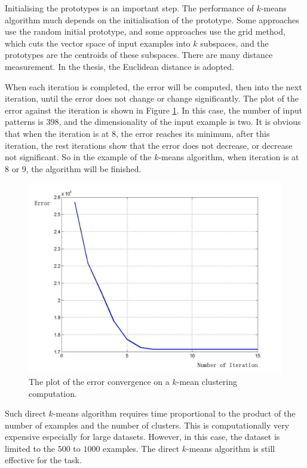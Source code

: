 Initialising the prototypes is an important step. The performance of $k$-means algorithm much depends on the initialisation of the prototype. Some approaches use the random initial prototype, and some approaches use the grid method, which cuts the vector space of input examples into $k$ subspaces, and the prototypes are the centroids of these subspaces. There are many distance measurement. In the thesis, the Euclidean distance is adopted. 

When each iteration is completed, the error will be computed, then into the next iteration, until the error does not change or change significantly. The plot of the error against the iteration is shown in \mbox{Figure} \ref{fig:kmeanserror}. In this case, the number of input patterns is $398$, and the dimensionality of the input example is two. It is obvious that when the iteration is at 8, the error reaches its minimum, after this iteration, the rest iterations show that the error does not decrease, or decrease not significant. So in the example of the $k$-means algorithm, when iteration is at 8 or 9, the algorithm will be finished.
\begin{figure}[ht]
 \includegraphics[width=\columnwidth]{ch3/figures/kmeanserror.jpg}
\caption{The plot of the error convergence on a $k$-mean clustering computation.}
\label{fig:kmeanserror}
\end{figure} 

Such direct $k$-means algorithm requires time proportional to the product of the number of examples and the number of clusters. This is computationally very expensive especially for large datasets.  However, in this case, the dataset is limited to the $500$ to $1000$ examples. The direct $k$-means algorithm is still effective for the task.

